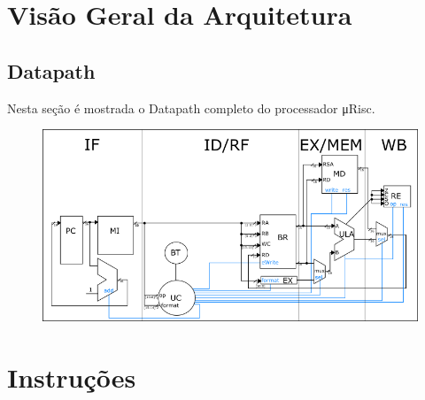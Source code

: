 \documentclass{article}
\begin{document}
  
  
\section{Visão Geral da Arquitetura}


\subsection{Datapath}
Nesta seção é mostrada o Datapath completo do processador \si\micro Risc.
\begin{figure}[H]
	\centering
	\includegraphics[width=\textwidth]{./pictures/datapath.png}
\end{figure}


\section{Instruções}
\end{document}
